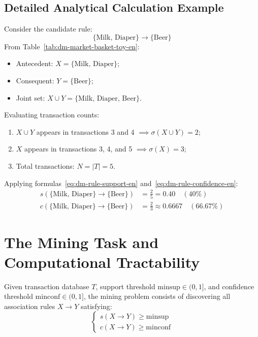 \subsection{Detailed Analytical Calculation Example}
Consider the candidate rule:
\begin{equation}
\{\text{Milk, Diaper}\} \longrightarrow \{\text{Beer}\}
\end{equation}
From Table~\ref{tab:dm-market-basket-toy-en}:
\begin{itemize}[noitemsep]
    \item Antecedent: $X = \{\text{Milk, Diaper}\}$;
    \item Consequent: $Y = \{\text{Beer}\}$;
    \item Joint set: $X \cup Y = \{\text{Milk, Diaper, Beer}\}$.
\end{itemize}

Evaluating transaction counts:
\begin{enumerate}[noitemsep]
    \item $X \cup Y$ appears in transactions 3 and 4 $\implies \sigma(X \cup Y) = 2$;
    \item $X$ appears in transactions 3, 4, and 5 $\implies \sigma(X) = 3$;
    \item Total transactions: $N = |T| = 5$.
\end{enumerate}

Applying formulas~\eqref{eq:dm-rule-support-en} and~\eqref{eq:dm-rule-confidence-en}:
\begin{align}
s(\{\text{Milk, Diaper}\} \rightarrow \{\text{Beer}\}) &= \frac{2}{5} = 0.40 \quad (40\%) \\
c(\{\text{Milk, Diaper}\} \rightarrow \{\text{Beer}\}) &= \frac{2}{3} \approx 0.6667 \quad (66.67\%)
\end{align}

\section{The Mining Task and Computational Tractability}
\label{sec:dm-mining-task-complexity}

\begin{definition}
Given transaction database $T$, support threshold $\mathrm{minsup} \in (0, 1]$, and confidence threshold $\mathrm{minconf} \in (0, 1]$, the mining problem consists of discovering all association rules $X \rightarrow Y$ satisfying:
\begin{equation}
\label{eq:dm-mining-constraints-en}
\begin{cases}
s(X \longrightarrow Y) \ge \mathrm{minsup} \\
c(X \longrightarrow Y) \ge \mathrm{minconf}
\end{cases}
\end{equation}
\end{definition}

